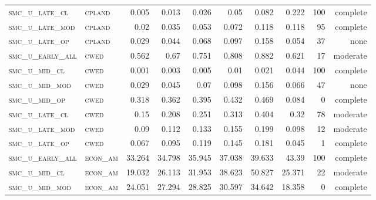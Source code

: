 \begin{landscape}
\begin{center}
\begin{footnotesize}
\begin{longtable}{llrrrrr|rrr}
\textsc{smc\_u\_late\_cl  } & \textsc{cpland    }   & 0.005    & 0.013    & 0.026    & 0.05     & 0.082    & 0.222         & 100           & complete        \\
\textsc{smc\_u\_late\_mod } & \textsc{cpland    }   & 0.02     & 0.035    & 0.053    & 0.072    & 0.118    & 0.118         & 95            & complete        \\
\textsc{smc\_u\_late\_op  } & \textsc{cpland    }   & 0.029    & 0.044    & 0.068    & 0.097    & 0.158    & 0.054         & 37            & none        \\
\textsc{smc\_u\_early\_all} & \textsc{cwed      }   & 0.562    & 0.67     & 0.751    & 0.808    & 0.882    & 0.621         & 17            & moderate        \\
\textsc{smc\_u\_mid\_cl   } & \textsc{cwed      }   & 0.001    & 0.003    & 0.005    & 0.01     & 0.021    & 0.044         & 100           & complete        \\
\textsc{smc\_u\_mid\_mod  } & \textsc{cwed      }   & 0.029    & 0.045    & 0.07     & 0.098    & 0.156    & 0.066         & 47            & none        \\
\textsc{smc\_u\_mid\_op   } & \textsc{cwed      }   & 0.318    & 0.362    & 0.395    & 0.432    & 0.469    & 0.084         & 0             & complete            \\
\textsc{smc\_u\_late\_cl  } & \textsc{cwed      }   & 0.15     & 0.208    & 0.251    & 0.313    & 0.404    & 0.32          & 78            & moderate        \\
\textsc{smc\_u\_late\_mod } & \textsc{cwed      }   & 0.09     & 0.112    & 0.133    & 0.155    & 0.199    & 0.098         & 12            & moderate        \\
\textsc{smc\_u\_late\_op  } & \textsc{cwed      }   & 0.067    & 0.095    & 0.119    & 0.145    & 0.181    & 0.045         & 1             & complete        \\
\textsc{smc\_u\_early\_all} & \textsc{econ\_am  }   & 33.264   & 34.798   & 35.945   & 37.038   & 39.633   & 43.39         & 100           & complete        \\
\textsc{smc\_u\_mid\_cl   } & \textsc{econ\_am  }   & 19.032   & 26.113   & 31.953   & 38.623   & 50.827   & 25.371        & 22            & moderate        \\
\textsc{smc\_u\_mid\_mod  } & \textsc{econ\_am  }   & 24.051   & 27.294   & 28.825   & 30.597   & 34.642   & 18.358        & 0             & complete            \\

\end{longtable}
\end{footnotesize}
\end{center}
\end{landscape}
